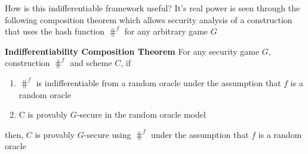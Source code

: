 \bigskip
\noindent How is this indifferentiable framework useful? It's real power is seen through the following composition theorem which allows security analysis of a construction that uses the hash function $\hash^f$ for any arbitrary game $G$

\begin{theorem}
\label{thm: indiff composition}
\textbf{Indifferentiability Composition Theorem} \cite{Maurer2004}
For any security game $G$, construction $\hash^f$ and scheme $C$, if 
\begin{enumerate}
    \item $\hash^f$ is indifferentiable from a random oracle under the assumption that $f$ is a random oracle
    \item C is provably $G$-secure in the random oracle model
\end{enumerate}
then, $C$ is provably $G$-secure using $\hash^f$ under the assumption that $f$ is a random oracle

\end{theorem}



